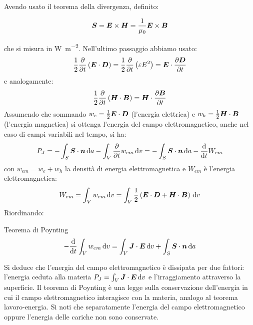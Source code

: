 Avendo usato il teorema della divergenza, definito:
\begin{Def}
  \begin{equation}
    \boldsymbol{S}=\boldsymbol{E}\times\boldsymbol{H} = \frac{1}{\mu_0}\boldsymbol{E}\times\boldsymbol{B}
  \end{equation}
\end{Def}
che si misura in \si{\watt\per\meter\squared}. Nell'ultimo passaggio abbiamo usato:
\begin{equation}
  \frac{1}{2}\frac{\partial}{\partial t}\left(\boldsymbol{E}\cdot\boldsymbol{D}\right)=\frac{1}{2}\frac{\partial}{\partial t}\left(\varepsilon E^2\right)=\boldsymbol{E}\cdot\frac{\partial\boldsymbol{D}}{\partial t}
\end{equation}
e analogamente:
\begin{equation}
  \frac{1}{2}\frac{\partial}{\partial t}\left(\boldsymbol{H}\cdot\boldsymbol{B}\right)=\boldsymbol{H}\cdot\frac{\partial\boldsymbol{B}}{\partial t}
\end{equation}
Assumendo che sommando $w_e=\frac{1}{2}\boldsymbol{E}\cdot\boldsymbol{D}$ (l'energia elettrica) e $w_h=\frac{1}{2}\boldsymbol{H}\cdot\boldsymbol{B}$ (l'energia magnetica) si ottenga l'energia del campo elettromagnetico, anche nel caso di campi variabili nel tempo, si ha:
\begin{equation}
  P_J=-\int_S\boldsymbol{S}\cdot\boldsymbol{n}\,\mathrm{d} a-\int_V\frac{\partial}{\partial t}{w_{em}}\,\mathrm{d} v=-\int_S\boldsymbol{S}\cdot\boldsymbol{n}\,\mathrm{d} a-\frac{\mathrm{d}}{\mathrm{d} t}{W_{em}}
\end{equation}
con $w_{em}=w_e+w_h$ la densità di energia elettromagnetica e $W_{em}$ è l'energia elettromagnetica:
\begin{equation}
  W_{em} = \int_V w_{em}\,\mathrm{d} v = \int_V \frac{1}{2}\left(\boldsymbol{E}\cdot\boldsymbol{D}+\boldsymbol{H}\cdot\boldsymbol{B}\right)\,\mathrm{d} v
\end{equation}
Riordinando:
\begin{Teo}{Teorema di Poynting}
  \begin{equation}
    -\frac{\mathrm{d}}{\mathrm{d} t}\int_V w_{em}\,\mathrm{d} v = \int_V \boldsymbol{J} \cdot \boldsymbol{E}\,\mathrm{d} v+\int_S\boldsymbol{S}\cdot\boldsymbol{n}\,\mathrm{d} a
  \end{equation}
\end{Teo}
Si deduce che l'energia del campo elettromagnetico è dissipata per due fattori: l'energia ceduta alla materia $P_J=\int_V \boldsymbol{J}\cdot\boldsymbol{E}\,\mathrm{d} v$ e l'irraggiamento attraverso la superficie. Il teorema di Poynting è una legge sulla conservazione dell'energia in cui il campo elettromagnetico interagisce con la materia, analogo al teorema lavoro-energia. Si noti che separatamente l'energia del campo elettromagnetico oppure l'energia delle cariche non sono conservate.

